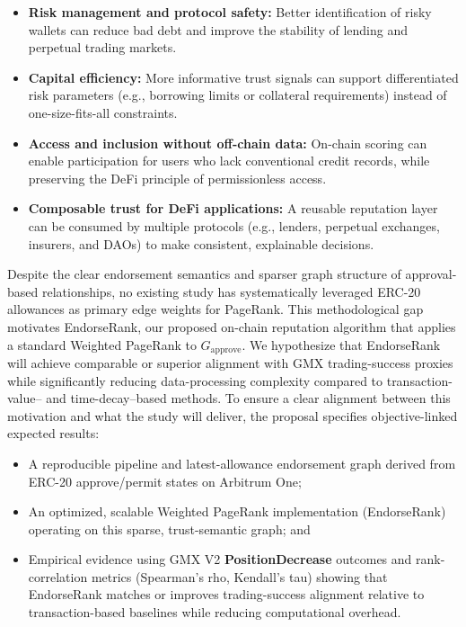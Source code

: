 \begin{itemize}
\item[\textbullet] \textbf{Risk management and protocol safety: }Better identification of risky wallets can reduce bad debt and improve the stability of lending and perpetual trading markets.
\item[\textbullet] \textbf{Capital efficiency: }More informative trust signals can support differentiated risk parameters (e.g., borrowing limits or collateral requirements) instead of one-size-fits-all constraints.
\item[\textbullet] \textbf{Access and inclusion without off-chain data: }On-chain scoring can enable participation for users who lack conventional credit records, while preserving the DeFi principle of permissionless access.
\item[\textbullet] \textbf{Composable trust for DeFi applications: }A reusable reputation layer can be consumed by multiple protocols (e.g., lenders, perpetual exchanges, insurers, and DAOs) to make consistent, explainable decisions.
\end{itemize}
Despite the clear endorsement semantics and sparser graph structure of approval-based relationships, no existing study has systematically leveraged ERC-20 allowances as primary edge weights for PageRank. This methodological gap motivates EndorseRank, our proposed on-chain reputation algorithm that applies a standard Weighted PageRank to $G_{\text{approve}}$. We hypothesize that EndorseRank will achieve comparable or superior alignment with GMX trading-success proxies while significantly reducing data-processing complexity compared to transaction-value-- and time-decay--based methods. To ensure a clear alignment between this motivation and what the study will deliver, the proposal specifies objective-linked expected results:


\begin{itemize}
\item[\textbullet] A reproducible pipeline and latest-allowance endorsement graph derived from ERC-20 approve/permit states on Arbitrum One;
\item[\textbullet] An optimized, scalable Weighted PageRank implementation (EndorseRank) operating on this sparse, trust-semantic graph; and
\item[\textbullet] Empirical evidence using GMX V2 \textbf{PositionDecrease} outcomes and rank-correlation metrics (Spearman's rho, Kendall's tau) showing that EndorseRank matches or improves trading-success alignment relative to transaction-based baselines while reducing computational overhead.
\end{itemize}
